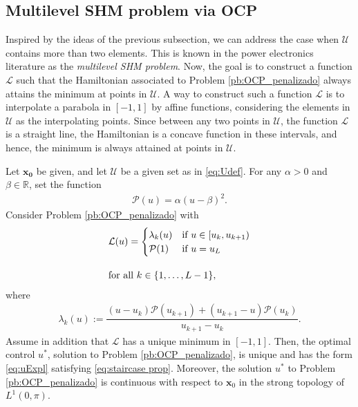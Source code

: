 \documentclass[twocolumn]{autart}    %
\begin{document}
\subsection{Multilevel SHM problem via OCP}

Inspired by the ideas of the previous subsection, we can address the case when $\mathcal{U}$ contains more than two elements. This is known in the power electronics literature as the \textit{multilevel SHM problem}. Now, the goal is to construct a function $\mathcal{L}$ such that the Hamiltonian associated to Problem \ref{pb:OCP_penalizado} always attains the minimum at points in $\mathcal{U}$. A way to construct such a function $\mathcal{L}$ is to interpolate a parabola in $[-1,1]$ by affine functions, considering the elements in $\mathcal{U}$ as the interpolating points.  Since between any two points in $\mathcal{U}$,  the function $\mathcal{L}$ is a straight line,  the Hamiltonian is a concave function in these intervals, and hence, the minimum is always attained at points in $\mathcal{U}$.

\vspace{0.5em}
\begin{theorem}\label{th:PLP}
	Let $\bm{x_0}$ be given, and let $\mathcal{U}$ be a given set as in \eqref{eq:Udef}. For any $\alpha>0$ and $\beta\in \mathbb{R}$, set the function
	\begin{align}\label{eq:parabola}
		\mathcal{P}(u) = \alpha (u-\beta)^2.
	\end{align}
	Consider Problem \ref{pb:OCP_penalizado} with 
	\begin{align}\label{eq:PLP}
		&\mathcal{L}(u) = \begin{cases}
			\lambda_k(u) & \text{if }  u \in [u_k,u_{k+1}) \\ \mathcal{P}(1) & \text{if } u = u_{L} 
		\end{cases} 
		\\[10pt]
		&\notag \text{for all } k \in \{1,\dots,L-1\}, 
	\end{align}
	where 
	\begin{align}\label{eq:lambda k}
		\lambda_k(u):= \dfrac{ (u-u_k)\mathcal{P}(u_{k+1}) + (u_{k+1}- u) \mathcal{P}(u_k)}{u_{k+1} - u_k}.
	\end{align}
	Assume in addition that $\mathcal{L}$ has a unique minimum in $[-1,1]$. Then, the optimal control $u^\ast$, solution to Problem \ref{pb:OCP_penalizado}, is unique and has the form \eqref{eq:uExpl} satisfying \eqref{eq:staircase prop}. Moreover, the solution $u^\ast$ to Problem \ref{pb:OCP_penalizado} is continuous with respect to $\bm{x}_0$ in the strong topology of $L^1(0,\pi)$.
\end{theorem}
\end{document}
